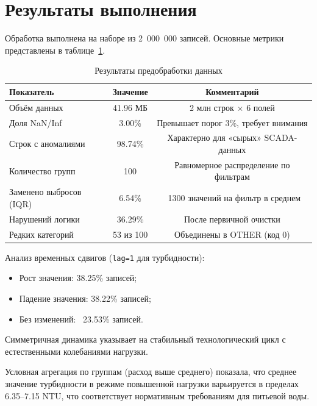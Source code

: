 \documentclass[oneside,a4paper,14pt]{extarticle}
\begin{document}
\section*{Результаты выполнения}
\indent
Обработка выполнена на наборе из 2~000~000 записей. Основные метрики представлены в таблице~\ref{tab:results}.

\begin{table}[htbp]
\centering
\caption{Результаты предобработки данных}
\label{tab:results}
\begin{tabular}{@{}lcc@{}}
\toprule
\textbf{Показатель} & \textbf{Значение} & \textbf{Комментарий} \\
\midrule
Объём данных & 41.96 МБ & 2 млн строк × 6 полей \\
Доля NaN/Inf & 3.00\% & Превышает порог 3\%, требует внимания \\
Строк с аномалиями & 98.74\% & Характерно для «сырых» SCADA-данных \\
Количество групп & 100 & Равномерное распределение по фильтрам \\
Заменено выбросов (IQR) & 6.54\% & ~1300 значений на фильтр в среднем \\
Нарушений логики & 36.29\% & После первичной очистки \\
Редких категорий & 53 из 100 & Объединены в OTHER (код 0) \\
\bottomrule
\end{tabular}
\end{table}

\indent
Анализ временных сдвигов (\texttt{lag=1} для турбидности):
\begin{itemize}
	\item Рост значения: 38.25\% записей;
	\item Падение значения: 38.22\% записей;
	\item Без изменений: ~23.53\% записей.
\end{itemize}
Симметричная динамика указывает на стабильный технологический цикл с естественными колебаниями нагрузки.

\indent
Условная агрегация по группам (расход выше среднего) показала, что среднее значение турбидности в режиме повышенной нагрузки варьируется в пределах 6.35--7.15 NTU, что соответствует нормативным требованиям для питьевой воды.
\end{document}
